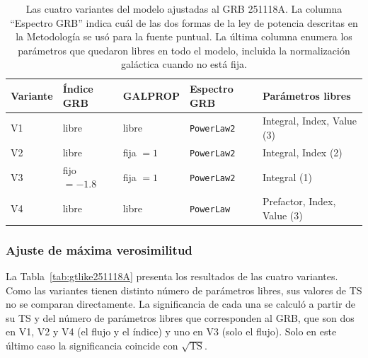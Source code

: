 \begin{table}[h!]
\centering
\caption{Las cuatro variantes del modelo ajustadas al GRB 251118A. La columna ``Espectro GRB'' indica cuál de
las dos formas de la ley de potencia descritas en la Metodología se usó para la fuente puntual. La
última columna enumera los parámetros que quedaron libres en todo el modelo, incluida la normalización
galáctica cuando no está fija.}
\label{tab:variantes251118A}
\small
\setlength{\tabcolsep}{4.5pt}
\begin{tabular}{lllll}
\toprule
\textbf{Variante} & \textbf{Índice GRB} & \textbf{GALPROP} & \textbf{Espectro GRB} & \textbf{Parámetros libres} \\
\midrule
V1 & libre & libre & \texttt{PowerLaw2} & Integral, Index, Value (3) \\
V2 & libre & fija $=1$ & \texttt{PowerLaw2} & Integral, Index (2) \\
V3 & fijo $=-1.8$ & fija $=1$ & \texttt{PowerLaw2} & Integral (1) \\
V4 & libre & libre & \texttt{PowerLaw} & Prefactor, Index, Value (3) \\
\bottomrule
\end{tabular}
\end{table}

\subsubsection{Ajuste de máxima verosimilitud}

La Tabla~\ref{tab:gtlike251118A} presenta los resultados de las cuatro variantes. Como las variantes
tienen distinto número de parámetros libres, sus valores de TS no se comparan directamente. La
significancia de cada una se calculó a partir de su TS y del número de parámetros libres que corresponden
al GRB, que son dos en V1, V2 y V4 (el flujo y el índice) y uno en V3 (solo el flujo). Solo en este último
caso la significancia coincide con $\sqrt{\mathrm{TS}}$.


